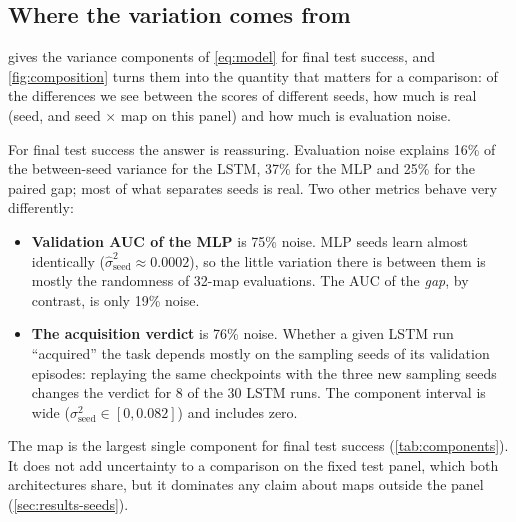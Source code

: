 \subsection{Where the variation comes from}
\label{sec:results-variance}

 gives the variance components of \cref{eq:model} for final test success,
and \cref{fig:composition} turns them into the quantity that matters for a comparison: of the
differences we see between the scores of different seeds, how much is real (seed, and seed
$\times$ map on this panel) and how much is evaluation noise.

For final test success the answer is reassuring. Evaluation noise explains 16\% of the
between-seed variance for the LSTM, 37\% for the MLP and 25\% for the paired gap; most of what
separates seeds is real. Two other metrics behave very differently:
\begin{itemize}
  \item \textbf{Validation AUC of the MLP} is 75\% noise. MLP seeds learn almost identically
  ($\hat\sigma^2_{\text{seed}}\approx 0.0002$), so the little variation there is between them is
  mostly the randomness of 32-map evaluations. The AUC of the \emph{gap}, by contrast, is only
  19\% noise.
  \item \textbf{The acquisition verdict} is 76\% noise. Whether a given LSTM run ``acquired'' the
  task depends mostly on the sampling seeds of its validation episodes: replaying the same
  checkpoints with the three new sampling seeds changes the verdict for 8 of the 30 LSTM runs.
  The component interval is wide ($\sigma^2_{\text{seed}}\in[0, 0.082]$) and includes zero.
\end{itemize}
The map is the largest single component for final test success (\cref{tab:components}). It does
not add uncertainty to a comparison on the fixed test panel, which both architectures share, but
it dominates any claim about maps outside the panel (\cref{sec:results-seeds}).

